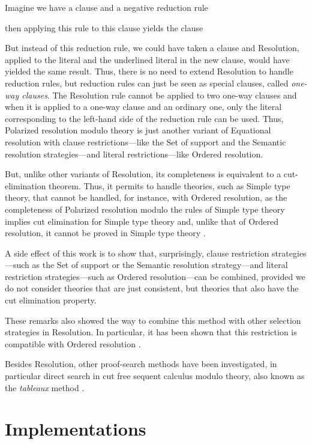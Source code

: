 \documentclass{llncs}
\begin{document}
Imagine we have a clause 
and a negative reduction rule 

then applying this rule to this clause yields the clause

But instead of this reduction rule, we could have taken a clause 
 and
Resolution, applied to the literal  and the underlined
literal in the new clause, would have yielded the same result. Thus,
there is no need to extend Resolution to handle reduction rules, but
reduction rules can just be seen as special clauses, called {\em
  one-way clauses}. The Resolution rule cannot be applied to two
one-way clauses and when it is applied to a one-way clause and an
ordinary one, only the literal corresponding to the left-hand side of
the reduction rule can be used. Thus, Polarized resolution modulo
theory is just another variant of Equational resolution with clause
restrictions---like the Set of support \cite{Wos} and the Semantic
resolution \cite{Slagle} strategies---and literal restrictions---like
Ordered resolution.

But, unlike other variants of Resolution, its completeness is
equivalent to a cut-elimination theorem. Thus, it permits to handle
theories, such as Simple type theory, that cannot be handled, for
instance, with Ordered resolution, as the completeness of Polarized
resolution modulo the rules of Simple type theory implies cut
elimination for Simple type theory and, unlike that of Ordered
resolution, it cannot be proved in Simple type theory
\cite{BurelDowek}.

A side effect of this work is to show that, surprisingly, clause
restriction strategies---such as the Set of support or the Semantic
resolution strategy---and literal restriction strategies---such as
Ordered resolution---can be combined, provided we do not consider
theories that are just consistent, but theories that also have the cut
elimination property.

These remarks also showed the way to combine this method with other
selection strategies in Resolution. In particular, it has been shown
that this restriction is compatible with Ordered resolution
\cite{Burel10}.

Besides Resolution, other proof-search methods have been investigated, 
in particular direct search in cut free sequent calculus modulo theory, 
also known as the {\em tableaux} method \cite{BonichonHermant}.

\section{Implementations}
\end{document}
